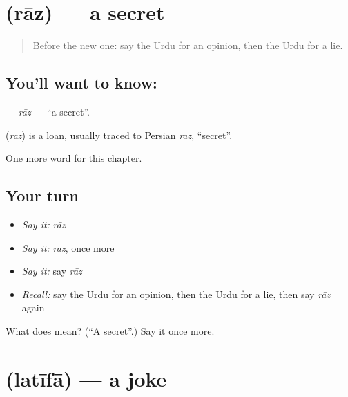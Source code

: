 \section[\texorpdfstring{\ur{راز} (rāz)}{راز (rāz)}]{ (rāz) — a secret}

\label{lesson:UR-C231-raz}



\begin{quote}
Before the new one: say the Urdu for an opinion, then the Urdu for a lie.
\end{quote}

\subsection*{You'll want to know: }
\textbf{} — \emph{rāz} — \textquotedblleft{}a secret\textquotedblright{}.

\begin{cousinweb}
\textbf{} (\emph{rāz}) is a loan, usually traced to Persian \emph{rāz}, \textquotedblleft{}secret\textquotedblright{}.
\end{cousinweb}

\begin{grammarlens}[title={What you've built}]
One more word for this chapter.
\end{grammarlens}

\subsection*{Your turn}
\begin{itemize}
\raggedright
  \item \emph{Say it:} \emph{rāz}
  \item \emph{Say it:} \emph{rāz}, once more
  \item \emph{Say it:} say \emph{rāz}
  \item \emph{Recall:} say the Urdu for an opinion, then the Urdu for a lie, then say \emph{rāz} again
\end{itemize}

\begin{tcolorbox}[breakable,colback=teal!4,colframe=teal!35!black,title={Before you move on}]
What does  mean? (\textquotedblleft{}A secret\textquotedblright{}.) Say it once more.
\end{tcolorbox}
\section[\texorpdfstring{\ur{لطیفہ} (latīfā)}{لطیفہ (latīfā)}]{ (latīfā) — a joke}

